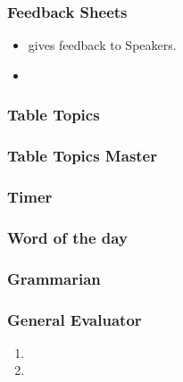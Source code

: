 \begin{frame} 
\frametitle{Feedback Sheets} 
\begin{itemize}
\item gives feedback to Speakers. 
\item 
\end{itemize}
\end{frame}


\begin{frame} 
\frametitle{Table Topics}
\end{frame}


\begin{frame} 
\frametitle{Table Topics Master} 
\end{frame} 

\begin{frame} 
\frametitle{Timer} 
\end{frame} 

\begin{frame} 
\frametitle{Word of the day}
\end{frame} 

\begin{frame} 
\frametitle{Grammarian} 
\end{frame} 

\begin{frame} 
\frametitle{General Evaluator} 
\begin{enumerate} 
\tiny \item \tiny 
\item \tiny 
\end{enumerate} 
\end{frame}


